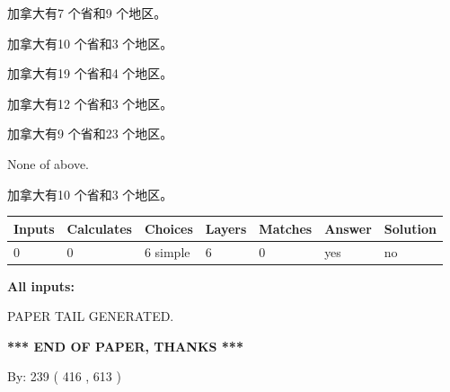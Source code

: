 \documentclass{ctexart}
\begin{document}
 
加拿大有7 个省和9 个地区。
 
 
加拿大有10 个省和3 个地区。
 
 
加拿大有19 个省和4 个地区。
 
 
加拿大有12 个省和3 个地区。
 
 
加拿大有9 个省和23 个地区。
 
 
 None of above.
 
 
\noindent{}
 
 
加拿大有10 个省和3 个地区。
 
 
\noindent{}
 
 
   
   
   
   
\noindent\begin{tabular}{|l|l|l|l|l|l|l|}
 \hline
Inputs & Calculates & Choices & Layers & Matches & Answer & Solution \\ \hline
 0  & 
 0  & 
 6
  simple  
  & 
 6  & 
 0  & 
  yes & 
  no 
  \\ \hline
 \end{tabular}
   
   
   
   
\noindent{}
   
   
   
   
\noindent\vspace{0.1in}\hspace{-0.08in} {\textbf{\Large{All inputs: }}}
   
   
   
   
   
   
 \vspace{0.2in}
 
   
   
\vspace{2.0in} PAPER TAIL GENERATED.
   
   
   
   
\vspace{1.0in} 
{\textbf{\large{ *** END OF PAPER, THANKS *** }}} 
   
   
\hspace{1.0in} By: 
 239 ( 416 ,  613 )
   
\end{document}
